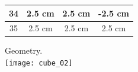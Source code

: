 \documentclass[11pt,oneside,a4paper,final]{article}
\begin{document}
\begin{figure}[tbh]
{{\begin{tabular}{|c|c|c|c|}
	34 & 2.5 cm &  2.5 cm & -2.5 cm \\
	\hline
	35 & 2.5 cm &  2.5 cm & 2.5 cm \\
	\hline
\end{tabular}}}
\else
 Geometry.\\{\texttt{[image: cube\_02]}}\\[1em]
 

\end{figure}
\end{document}
